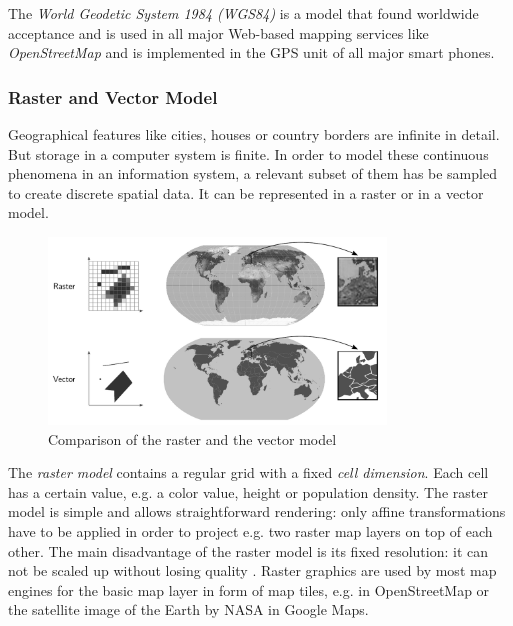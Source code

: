 The \emph{World Geodetic System 1984 (WGS84)} is a model that found worldwide acceptance and is used in all major Web-based mapping services like \emph{OpenStreetMap} and is implemented in the GPS unit of all major smart phones.



\subsubsection{Raster and Vector Model} %
\label{ssub:raster_vs_vector_model}

Geographical features like cities, houses or country borders are infinite in detail. But storage in a computer system is finite. In order to model these continuous phenomena in an information system, a relevant subset of them has be sampled to create discrete spatial data. It can be represented in a raster or in a vector model.

\begin{figure}[H]
  \centering
  \includegraphics[width=0.8\textwidth]{graphics/basics/raster_vector}
  \caption{Comparison of the raster and the vector model}
  \label{fig:raster_vector}
\end{figure}

The \emph{raster model} contains a regular grid with a fixed \emph{cell dimension}. Each cell has a certain value, e.g. a color value, height or population density.
The raster model is simple and allows straightforward rendering: only affine transformations have to be applied in order to project e.g. two raster map layers on top of each other. The main disadvantage of the raster model is its fixed resolution: it can not be scaled up without losing quality
\cite[pp.42-48]{bolstad2008gis}.
Raster graphics are used by most map engines for the basic map layer in form of map tiles, e.g. in OpenStreetMap or the satellite image of the Earth by NASA in Google Maps.

